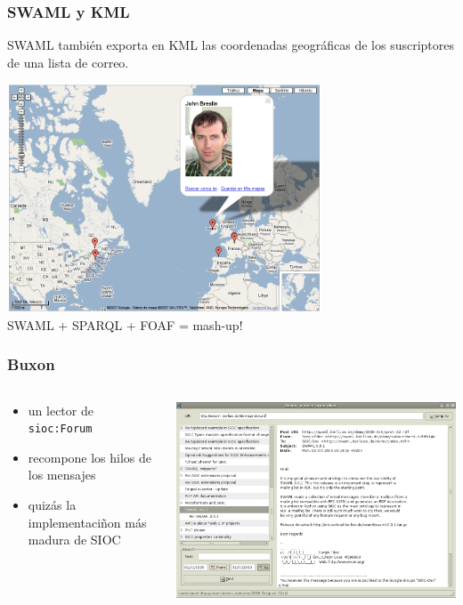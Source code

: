 \documentclass[spanish,notes=hide]{beamer}
\begin{document}
\frame
{
  \frametitle{SWAML y KML}

  SWAML también exporta en KML las coordenadas geográficas de los suscriptores
  de una lista de correo.

  \begin{center}
    \includegraphics[width=0.7\textwidth]{images/googlemaps.png}\\
    SWAML + SPARQL + FOAF = mash-up!
  \end{center}
}
\frame
{
  \frametitle{Buxon}

  \begin{columns}
   \begin{column}{0.32\textwidth}
	\begin{itemize}
	  \item un lector de \texttt{sioc:Forum}
	  \item recompone los hilos de los mensajes
	  \item quizás la implementaciñon más madura de SIOC
	\end{itemize}
   \end{column}
   \begin{column}{0.68\textwidth}
	\includegraphics[width=\textwidth]{images/buxon.png}
   \end{column}
  \end{columns}
}
\end{document}

